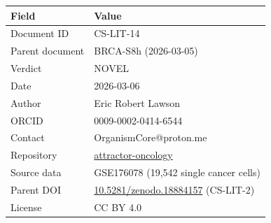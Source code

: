\documentclass[12pt, a4paper]{article}
\begin{document}
\begin{tabular}{ll}
\toprule
\textbf{Field} & \textbf{Value} \\
\midrule
Document ID & CS-LIT-14 \\
Parent document & BRCA-S8h (2026-03-05) \\
Verdict & NOVEL \\
Date & 2026-03-06 \\
Author & Eric Robert Lawson \\
ORCID & 0009-0002-0414-6544 \\
Contact & OrganismCore@proton.me \\
Repository &
\href{https://github.com/Eric-Robert-Lawson/attractor-oncology}
{attractor-oncology} \\
Source data & GSE176078 (19,542 single cancer cells) \\
Parent DOI &
\href{https://doi.org/10.5281/zenodo.18884157}
{10.5281/zenodo.18884157} (CS-LIT-2) \\
License & CC BY 4.0 \\
\bottomrule
\end{tabular}
\end{document}

